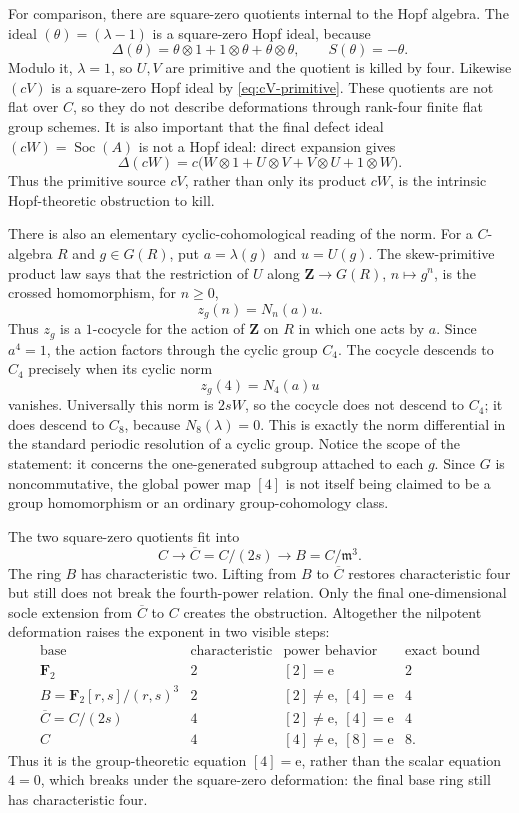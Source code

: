 \documentclass[11pt]{amsart}
\theoremstyle{definition}
\theoremstyle{remark}
\newcommand{\Z}{\mathbf Z}
\newcommand{\F}{\mathbf F}
\newcommand{\Soc}{\operatorname{Soc}}
\newcommand{\m}{\mathfrak m}
\newcommand{\ot}{\otimes}
\newcommand{\unit}{\mathrm e}
\begin{document}
For comparison, there are square-zero quotients internal to the Hopf
algebra.  The ideal \((\theta)=(\lambda-1)\) is a square-zero Hopf ideal,
because
\[
 \Delta(\theta)=\theta\ot1+1\ot\theta+\theta\ot\theta,
 \qquad S(\theta)=-\theta.
\]
Modulo it, \(\lambda=1\), so \(U,V\) are primitive and the quotient is
killed by four.  Likewise \((cV)\) is a square-zero Hopf ideal by
\eqref{eq:cV-primitive}.  These quotients are not flat over \(C\), so they
do not describe deformations through rank-four finite flat group schemes.
It is also important that the final defect ideal \((cW)=\Soc(A)\) is not a
Hopf ideal: direct expansion gives
\[
 \Delta(cW)=c\bigl(W\ot1+U\ot V+V\ot U+1\ot W\bigr).
\]
Thus the primitive source \(cV\), rather than only its product \(cW\), is
the intrinsic Hopf-theoretic obstruction to kill.

There is also an elementary cyclic-cohomological reading of the norm.  For
a \(C\)-algebra \(R\) and \(g\in G(R)\), put
\(a=\lambda(g)\) and \(u=U(g)\).  The skew-primitive product law says that
the restriction of \(U\) along \(\Z\to G(R)\), \(n\mapsto g^n\), is the
crossed homomorphism, for \(n\ge0\),
\[
 z_g(n)=N_n(a)u.
\]
Thus \(z_g\) is a \(1\)-cocycle for the action of \(\Z\) on \(R\) in which
one acts by \(a\).  Since \(a^4=1\), the action factors through the cyclic
group \(C_4\).  The cocycle descends to \(C_4\) precisely when its cyclic
norm
\[
 z_g(4)=N_4(a)u
\]
vanishes.  Universally this norm is \(2sW\), so the cocycle does not descend
to \(C_4\); it does descend to \(C_8\), because \(N_8(\lambda)=0\).  This
is exactly the norm differential in the standard periodic resolution of a
cyclic group.  Notice the scope of the statement: it concerns the
one-generated subgroup attached to each \(g\).  Since \(G\) is
noncommutative, the global power map \([4]\) is not itself being claimed to
be a group homomorphism or an ordinary group-cohomology class.

The two square-zero quotients fit into
\[
 C\longrightarrow\overline C=C/(2s)
 \longrightarrow B=C/\m^3.
\]
The ring \(B\) has characteristic two.  Lifting from \(B\) to
\(\overline C\) restores characteristic four but still does not break the
fourth-power relation.  Only the final one-dimensional socle extension
from \(\overline C\) to \(C\) creates the obstruction.  Altogether the
nilpotent deformation raises the exponent in two visible steps:
\[
 \begin{array}{c|c|c|c}
  \text{base}&\text{characteristic}&\text{power behavior}
             &\text{exact bound}\\ \hline
  \F_2&2&[2]=\unit&2\\
  B=\F_2[r,s]/(r,s)^3&2&[2]\ne\unit,\ [4]=\unit&4\\
  \overline C=C/(2s)&4&[2]\ne\unit,\ [4]=\unit&4\\
  C&4&[4]\ne\unit,\ [8]=\unit&8.
 \end{array}
\]
Thus it is the group-theoretic equation \([4]=\unit\), rather than the
scalar equation \(4=0\), which breaks under the square-zero deformation:
the final base ring still has characteristic four.
\end{document}
